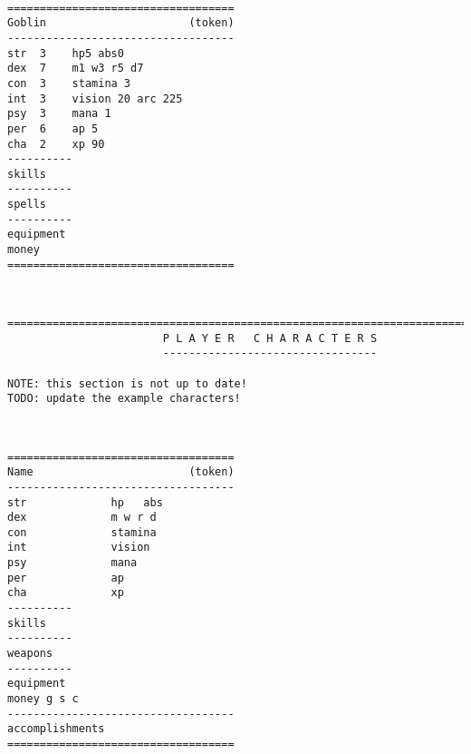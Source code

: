 \

\pagebreak[1]
\tiny \begin{samepage} \begin{verbatim}
===================================
Goblin                      (token)
-----------------------------------
str  3    hp5 abs0
dex  7    m1 w3 r5 d7
con  3    stamina 3
int  3    vision 20 arc 225
psy  3    mana 1
per  6    ap 5
cha  2    xp 90
----------
skills
----------
spells
----------
equipment
money
===================================
\end{verbatim} \end{samepage} \normalsize

\





\pagebreak[1]
\tiny \begin{samepage} \begin{verbatim}
================================================================================
                        P L A Y E R   C H A R A C T E R S
                        ---------------------------------

NOTE: this section is not up to date!
TODO: update the example characters!
\end{verbatim} \end{samepage} \normalsize


\


\pagebreak[3]
\tiny \begin{samepage} \begin{verbatim}
===================================
Name                        (token)
-----------------------------------
str             hp   abs
dex             m w r d
con             stamina
int             vision
psy             mana
per             ap
cha             xp
----------
skills
----------
weapons
----------
equipment
money g s c
-----------------------------------
accomplishments
===================================
\end{verbatim} \end{samepage} \normalsize


\


